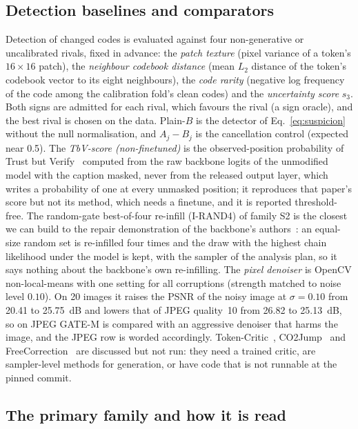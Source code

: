 \subsection{Detection baselines and comparators}\label{ssec:baselines}
Detection of changed codes is evaluated against four non-generative or uncalibrated rivals, fixed in advance:
the \emph{patch texture} (pixel variance of a token's $16\times16$ patch), the \emph{neighbour codebook distance}
(mean $L_2$ distance of the token's codebook vector to its eight neighbours), the \emph{code rarity} (negative log frequency of the
code among the calibration fold's clean codes) and the \emph{uncertainty score} $s_3$.
Both signs are admitted for each rival, which favours the rival (a sign oracle), and the best rival is chosen on the data.
Plain-$B$ is the detector of Eq.~\eqref{eq:suspicion} without the null normalisation, and $A_j-B_j$ is the cancellation control
(expected near 0.5).
The \emph{TbV-score (non-finetuned)} is the observed-position probability of Trust but Verify~\cite{jhingran2026trustverify}
computed from the raw backbone logits of the unmodified model with the caption masked, never from the released output layer, which
writes a probability of one at every unmasked position; it reproduces that paper's score but not its method, which needs a finetune,
and it is reported threshold-free.
The random-gate best-of-four re-infill (I-RAND4) of family S2 is the closest we can build to the repair demonstration of the
backbone's authors~\cite{swerdlow2025unidisc}: an equal-size random set is re-infilled four times and the draw with the highest chain
likelihood under the model is kept, with the sampler of the analysis plan, so it says nothing about the backbone's own re-infilling.
The \emph{pixel denoiser} is OpenCV non-local-means with one setting for all corruptions (strength matched to noise level $0.10$).
On 20 images it raises the PSNR of the noisy image at $\sigma=0.10$ from 20.41 to 25.75~dB and lowers that of JPEG quality~10 from
26.82 to 25.13~dB, so on JPEG GATE-M is compared with an aggressive denoiser that harms the image, and the JPEG row is worded
accordingly.
Token-Critic~\cite{lezama2022tokencritic}, CO2Jump~\cite{le2026co2jump} and FreeCorrection~\cite{ouyang2026freecorrection} are
discussed but not run: they need a trained critic, are sampler-level methods for generation, or have code that is not
runnable at the pinned commit.

\subsection{The primary family and how it is read}\label{ssec:tests}

